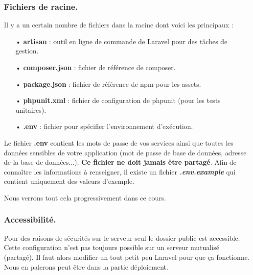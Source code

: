 \documentclass[12pt,a4paper]{article}
\begin{document}
\subsubsection{Fichiers de racine.}
Il y a un certain nombre de fichiers dans la racine dont voici les principaux :

\begin{itemize}

\item[•] \textbf{artisan} : outil en ligne de commande de Laravel pour des tâches de gestion.\\

\item[•] \textbf{composer.json} : fichier de référence de composer.\\

\item[•] \textbf{package.json} : fichier de référence de npm pour les assets. \\

\item[•] \textbf{phpunit.xml} : fichier de configuration de phpunit (pour les tests unitaires).\\

\item[•] \textbf{.env} : fichier pour spécifier l'environnement d'exécution.\\

\end{itemize}

Le fichier \textbf{.env} contient les mots de passe de vos services ainsi que toutes les
données sensibles de votre application (mot de passe de base de données, adresse de la base de données...). \textbf{Ce fichier ne doit jamais être partagé}. Afin de connaître les informations à renseigner, il existe un fichier \textbf{\textit{.env.example}} qui contient uniquement des valeurs d'exemple.\par
Nous verrons tout cela progressivement dans ce cours.








\subsubsection{Accessibilité.}
Pour des raisons de sécurités sur le serveur seul le dossier public est accessible.
Cette configuration n'est pas toujours possible sur un serveur mutualisé (partagé). Il faut alors modifier un tout petit peu Laravel pour que ça fonctionne. Nous en palerons peut être dans la partie déploiement.
\end{document}
